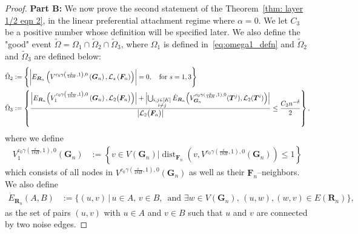 \documentclass[twoside,11pt]{article}
\theoremstyle{remark}
\begin{document}
\begin{proof}
\textbf{Part B:} We now prove the second statement of the Theorem~\eqref{thm: layer 1/2 eqn 2}, in the linear preferential attachment regime where $\alpha=0$. We let $C_3$ be a positive number whose definition will be specified later. We also define the "good" event
$\tilde{\Omega}={\Omega}_1\cap \tilde{\Omega}_2\cap \tilde{\Omega}_3$, where $\Omega_1$ is defined in~\eqref{eq:omega1_defn} and $\tilde{\Omega}_2$ and $\tilde{\Omega}_3$ are defined below:
%
\begingroup
\begin{align*}
    \tilde{\Omega}_2 &:= \left\{\left|E_{\boldsymbol{R}_n}\left(V^{c_0\gamma\left(\frac{\varepsilon}{18 H}, 1\right), 0}\left(\boldsymbol{G}_n\right), \mathcal{L}_s\left(\boldsymbol{F}_n\right)\right)\right|=0, \quad\text{for $s=1,3$}\right\}\\
    \tilde{\Omega}_3 &:= \left\{\frac{\Bigl|E_{\boldsymbol{R}_n}\Bigl(V_1^{c_0\gamma\left(\frac{\varepsilon}{18 H}, 1\right), 0}\left(\boldsymbol{G}_n\right), \mathcal{L}_2\bigl(\boldsymbol{F}_n\bigr)\Bigr)\Bigr|+\Bigl|\bigcup_{\substack{i,j\in[K]\\ i\neq j}} \dot{E}_{\boldsymbol{R}_n}\Bigl(V^{c_0 \gamma(\frac{\varepsilon}{18H}, 1), 0}_{\bm{G}_n}(\bm{T}^j), \mathcal{L}_2(\boldsymbol{T}^{i})\Bigr)\Bigr|}{\bigl|\mathcal{L}_2\bigl(\boldsymbol{F}_n\bigr)\bigr|}\le \frac{C_3 n^{-\delta}}{2}\right\},
\end{align*}
\endgroup
%
where we define 
%
\begin{align*}
V_1^{c_0\gamma\left(\frac{\varepsilon}{18 H}, 1\right),0}\left(\boldsymbol{G}_n\right)&:=\left\{v \in V\left(\boldsymbol{G}_n\right) \bigg |  \operatorname{dist}_{\bm{F}_n}\left(v, V^{c_0\gamma\left(\frac{\varepsilon}{18 H}, 1\right), 0}\left(\boldsymbol{G}_n\right)\right)\le 1\right\}
\end{align*}
which consists of all nodes in $V^{c_0 \gamma(\frac{\varepsilon}{18H}, 1), 0}(\bm{G}_n)$ as well as their $\bm{F}_n$--neighbors. We also define 
\begin{align*}
\dot{E}_{\boldsymbol{R}_n}(A, B) &:= \bigl\{(u, v) \,\big|\, u \in A,\, v \in B,\, \text{ and } \exists w \in V(\bm{G}_n),\, (u, w), (w, v) \in E(\bm{R}_n) \bigr\},
\end{align*}
as the set of pairs $(u, v)$ with $u \in A$ and $v \in B$ such that $u$ and $v$ are connected by two noise edges. 
%


\end{proof}
\end{document}
